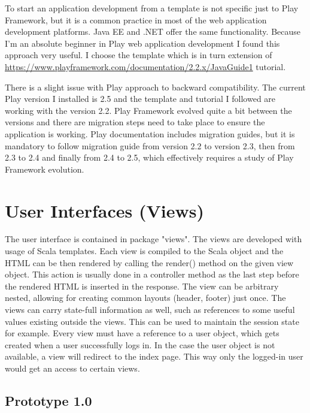 \documentclass[12pt,twoside,a4paper]{report}
\begin{document}
To start an application development from a template is not specific just to Play Framework, but it is a common practice in most of the web application development platforms. Java EE and .NET offer the same functionality. Because I'm an absolute beginner in Play web application development I found this approach very useful. I choose the template which is in turn extension of \url{https://www.playframework.com/documentation/2.2.x/JavaGuide1} tutorial.

There is a slight issue with Play approach to backward compatibility. The current Play version I installed is 2.5 and the template and tutorial I followed are working with the version 2.2. Play Framework evolved quite a bit between the versions and there are migration steps need to take place to ensure the application is working. Play documentation includes migration guides, but it is mandatory to follow migration guide from version 2.2 to version 2.3, then from 2.3 to 2.4 and finally from 2.4 to 2.5, which effectively requires a study of Play Framework evolution. 

\section{User Interfaces (Views)}\label{4.3}

The user interface is contained in package "views". The views are developed with usage of Scala templates. Each view is compiled to the Scala object and the HTML can be then rendered by calling the render() method on the given view object. This action is usually done in a controller method as the last step before the rendered HTML is inserted in the response. The view can be arbitrary nested, allowing for creating common layouts (header, footer) just once. The views can carry state-full information as well, such as references to some useful values existing outside the views. This can be used to maintain the session state for example. Every view must have a reference to a user object, which gets created when a user successfully logs in. In the case the user object is not available, a view will redirect to the index page. This way only the logged-in user would get an access to certain views.

\subsection{Prototype 1.0}\label{4.3.1}
\end{document}
